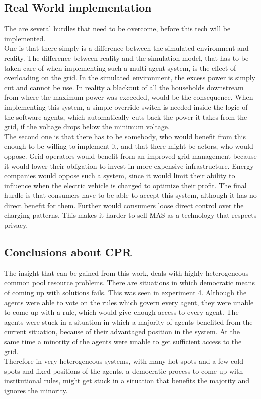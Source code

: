 \documentclass[a4paper]{article}
\begin{document}
\subsection{Real World implementation}
The are several hurdles that need to be overcome, before this tech will be implemented. \\
One is that there simply is a difference between the simulated environment and reality. 
The difference between reality and the simulation model, that has to be taken care of when implementing such a multi agent system, is 
the effect of overloading on the grid. 
In the simulated environment, the excess power is simply cut and cannot be use.
In reality a blackout of all the households downstream from where the maximum power was exceeded, would be the consequence. 
When implementing this system, a simple override switch is needed inside the logic of the software agents, which automatically cuts 
back the power it takes from the grid, if the voltage drops below the minimum voltage.\\
The second one is that there has to be somebody, who would benefit from this enough to be willing to implement it, and that there might 
be actors, who would oppose. Grid operators would benefit from an improved grid management because it would lower their 
obligation to invest in more expensive infrastructure. Energy companies would oppose such a system, since it would limit their 
ability to influence when the electric vehicle is charged to optimize their profit. The final hurdle is that consumers have to be able
to accept this system, although it has no direct benefit for them. Further would consumers loose direct control over the charging patterns. 
This makes it harder to sell MAS as a technology that respects privacy. 

\subsection{Conclusions about CPR}
The insight that can be gained from this work, deals with highly heterogeneous common pool resource problems. 
There are situations in which democratic means of coming up with solutions fails. This was seen in experiment 4. 
Although the agents were able to vote on the rules which govern every agent, they were unable to come up with a
rule, which would give enough access to every agent. The agents were stuck in a situation in which a majority of 
agents benefited from the current situation, because of their advantaged position in the system. At the same time 
a minority of the agents were unable to get sufficient access to the grid.\\
Therefore in very heterogeneous systems, with many hot spots and a few cold spots and fixed positions of the agents, 
a democratic process to come up with institutional rules, might get stuck in a situation that benefits the majority and 
ignores the minority. 
\end{document}
